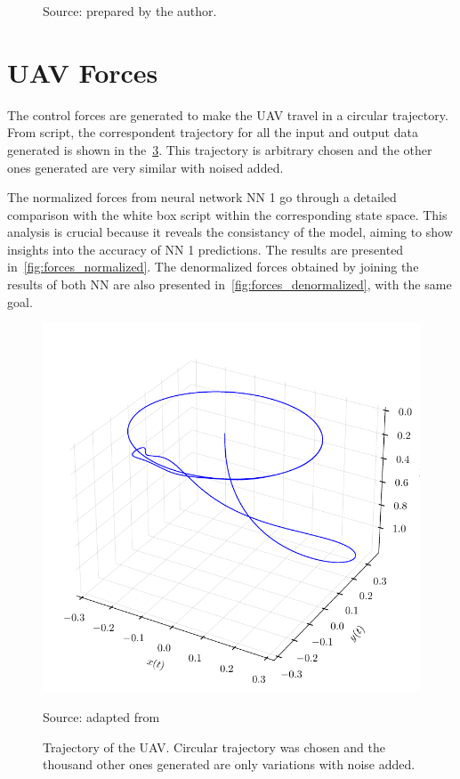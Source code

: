 \begin{figure}[!htb]
\begin{subfigure}{0.49\textwidth}
        \label{fig:test_loss_nn2}
    \end{subfigure}

    {\footnotesize Source: prepared by the author.}
    \label{fig:test_loss}
\end{figure}

\section{UAV Forces}

The control forces are generated to make the UAV travel in a circular trajectory. From \textcite{geronel2023} script, the correspondent trajectory for all the input and output data generated is shown in the~\cref{fig:trajectory}. 
This trajectory is arbitrary chosen and the other ones generated are very similar with noised added.


The normalized forces from neural network NN 1 go through a detailed comparison with the white box script within the corresponding state space. 
This analysis is crucial because it reveals the consistancy of the model, aiming to show insights into the accuracy of NN 1 predictions.
The results are presented in~\cref{fig:forces_normalized}.
The denormalized forces obtained by joining the results of both NN are also presented in~\cref{fig:forces_denormalized}, with the same goal.

\begin{figure}[!htb]
    \centering
    \caption[Trajectory of the UAV]{Trajectory of the UAV. Circular trajectory was chosen and the thousand other ones generated are only variations with noise added.}
    \includegraphics{figures/4results/uav/trajectory.pdf}
    
    {\footnotesize Source: adapted from \textcite{geronel2023}}
    \label{fig:trajectory}
\end{figure}

